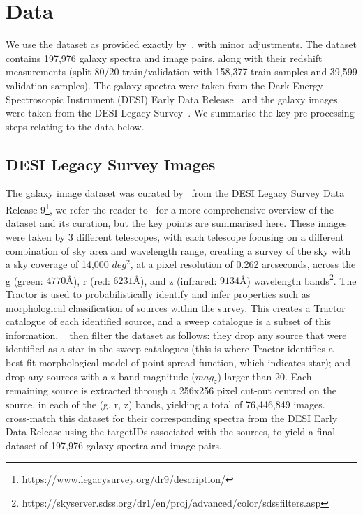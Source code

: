 
\section{Data}\label{sec:data}
We use the dataset as provided exactly by~\cite{astroclip}, with minor adjustments.
The dataset contains 197,976 galaxy spectra and image pairs, along with their redshift measurements (split 80/20 train/validation
with 158,377 train samples and 39,599 validation samples).
The galaxy spectra were taken from the Dark Energy Spectroscopic Instrument (DESI) Early Data Release~\citep{desiearly2023}
and the galaxy images were taken from the DESI Legacy Survey~\citep{desilegacy2018}.
We summarise the key pre-processing steps relating to the data below.

\subsection{DESI Legacy Survey Images}\label{subsec:images}
The galaxy image dataset was curated by~\cite{stein2022} from the DESI Legacy Survey Data Release 9\footnote{https://www.legacysurvey.org/dr9/description/},
we refer the reader to~\cite{stein2022, astroclip} for a more comprehensive overview of the dataset and its curation, but the
key points are summarised here.
These images were taken by 3 different telescopes, with each telescope focusing on a different combination of sky area
and wavelength range, creating a survey of the sky with a sky coverage of 14,000 $deg^{2}$, at a pixel resolution of 0.262 arcseconds,
across the g (green: $4770 \si{\angstrom}$), r (red: $6231 \si{\angstrom}$), and z (infrared: $9134 \si{\angstrom}$) wavelength
bands\footnote{https://skyserver.sdss.org/dr1/en/proj/advanced/color/sdssfilters.asp}.
The Tractor is used to probabilistically identify and infer properties such
as morphological classification of sources within the survey.
This creates a Tractor catalogue of each identified source, and a sweep catalogue is a subset of this information.
~\cite{stein2022} then filter the dataset as follows: they drop any source that were identified as a star in the sweep catalogues
(this is where Tractor identifies a best-fit morphological model of point-spread function, which indicates star); and drop any sources
with a z-band magnitude ($mag_{z}$) larger than 20.
Each remaining source is extracted through a 256x256 pixel cut-out centred on the source, in each of the (g, r, z) bands,
yielding a total of 76,446,849 images.
~\cite{astroclip} cross-match this dataset for their corresponding spectra from the DESI Early Data Release
using the targetIDs associated with the sources, to yield a final dataset of 197,976 galaxy spectra and image pairs.

